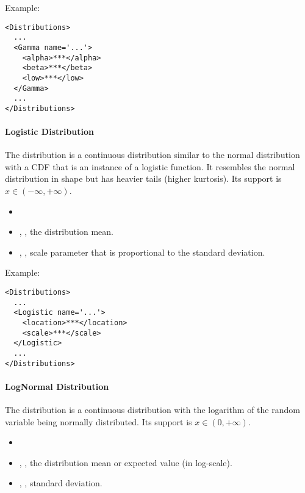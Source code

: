 Example:
\begin{lstlisting}[style=XML]
<Distributions>
  ...
  <Gamma name='...'>
    <alpha>***</alpha>
    <beta>***</beta>
    <low>***</low>
  </Gamma>
  ...
</Distributions>
\end{lstlisting}

\paragraph{Logistic Distribution}
\label{Logistic}
The  distribution is a continuous distribution similar to the
normal distribution with a CDF that is an instance of a logistic function.
%
It resembles the normal distribution in shape but has heavier tails (higher
kurtosis).
%
Its support is $x \in (-\infty,+\infty)$.

%
\attrIntro
\vspace{-5mm}
\begin{itemize}
\itemsep0em
\item \nameDescription
\end{itemize}
\vspace{-5mm}
\subnodesIntro
\begin{itemize}
\item {}, , the distribution
  mean.
\item {}, , scale parameter that
  is proportional to the standard deviation.
\end{itemize}

Example:
\begin{lstlisting}[style=XML]
<Distributions>
  ...
  <Logistic name='...'>
    <location>***</location>
    <scale>***</scale>
  </Logistic>
  ...
</Distributions>
\end{lstlisting}

\paragraph{LogNormal Distribution}
\label{LogNormal}
The  distribution is a continuous distribution with the
logarithm of the random variable being normally distributed.
%
Its support is $x \in (0, +\infty)$.

%
\attrIntro
\vspace{-5mm}
\begin{itemize}
\itemsep0em
\item \nameDescription
\end{itemize}
\vspace{-5mm}
\subnodesIntro
\begin{itemize}
\item {}, , the distribution mean
or expected value (in log-scale).
\item {}, , standard deviation.
\end{itemize}


